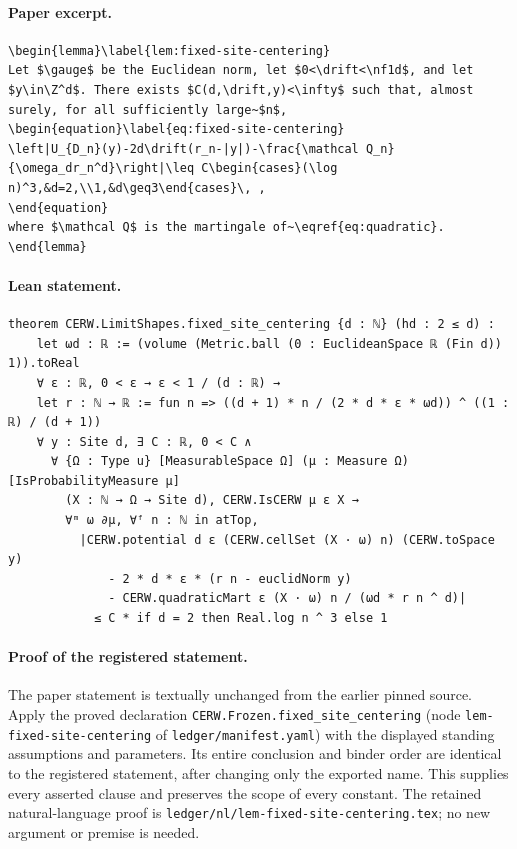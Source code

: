 \paragraph{Paper excerpt.}
\begin{verbatim}
\begin{lemma}\label{lem:fixed-site-centering}
Let $\gauge$ be the Euclidean norm, let $0<\drift<\nf1d$, and let $y\in\Z^d$. There exists $C(d,\drift,y)<\infty$ such that, almost surely, for all sufficiently large~$n$,
\begin{equation}\label{eq:fixed-site-centering}
\left|U_{D_n}(y)-2d\drift(r_n-|y|)-\frac{\mathcal Q_n}{\omega_dr_n^d}\right|\leq C\begin{cases}(\log n)^3,&d=2,\\1,&d\geq3\end{cases}\, ,
\end{equation}
where $\mathcal Q$ is the martingale of~\eqref{eq:quadratic}.
\end{lemma}
\end{verbatim}
\paragraph{Lean statement.}
\begin{verbatim}
theorem CERW.LimitShapes.fixed_site_centering {d : ℕ} (hd : 2 ≤ d) :
    let ωd : ℝ := (volume (Metric.ball (0 : EuclideanSpace ℝ (Fin d)) 1)).toReal
    ∀ ε : ℝ, 0 < ε → ε < 1 / (d : ℝ) →
    let r : ℕ → ℝ := fun n => ((d + 1) * n / (2 * d * ε * ωd)) ^ ((1 : ℝ) / (d + 1))
    ∀ y : Site d, ∃ C : ℝ, 0 < C ∧
      ∀ {Ω : Type u} [MeasurableSpace Ω] (μ : Measure Ω) [IsProbabilityMeasure μ]
        (X : ℕ → Ω → Site d), CERW.IsCERW μ ε X →
        ∀ᵐ ω ∂μ, ∀ᶠ n : ℕ in atTop,
          |CERW.potential d ε (CERW.cellSet (X · ω) n) (CERW.toSpace y)
              - 2 * d * ε * (r n - euclidNorm y)
              - CERW.quadraticMart ε (X · ω) n / (ωd * r n ^ d)|
            ≤ C * if d = 2 then Real.log n ^ 3 else 1
\end{verbatim}
\paragraph{Proof of the registered statement.}
The paper statement is textually unchanged from the earlier pinned source.
Apply the proved declaration \texttt{CERW.Frozen.fixed\_site\_centering}
(node \texttt{lem-fixed-site-centering} of \texttt{ledger/manifest.yaml}) with the displayed
standing assumptions and parameters. Its entire conclusion and binder order
are identical to the registered statement, after changing only the exported
name. This supplies every asserted clause and preserves the scope of every
constant. The retained natural-language proof is
\texttt{ledger/nl/lem-fixed-site-centering.tex}; no new argument or premise is needed.

